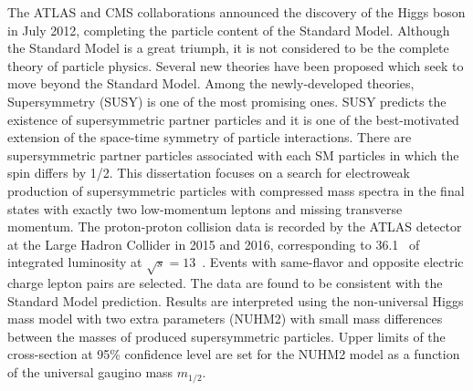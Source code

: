 The ATLAS and CMS collaborations announced the discovery of the Higgs boson in July 2012, completing the particle content of the Standard Model.
Although the Standard Model is a great triumph, it is not considered to be the complete theory of particle physics.
Several new theories have been proposed which seek to move beyond the Standard Model.
Among the newly-developed theories, Supersymmetry (SUSY) is one of the most promising ones.
SUSY predicts the existence of supersymmetric partner particles and it is one of the best-motivated extension of the space-time symmetry of particle interactions.
There are supersymmetric partner particles associated with each SM particles in which the spin differs by 1/2.
This dissertation focuses on a search for electroweak production of supersymmetric particles with compressed mass spectra in the final states with exactly two low-momentum leptons and missing transverse momentum.
The proton-proton collision data is recorded by the ATLAS detector at the Large Hadron Collider in 2015 and 2016, corresponding to 36.1~{\ifb} of integrated luminosity at $\sqrt{s} = 13$~{\TeV}.
Events with same-flavor and opposite electric charge lepton pairs are selected.
The data are found to be consistent with the Standard Model prediction.
Results are interpreted using the non-universal Higgs mass model with two extra parameters (NUHM2) with small mass differences between the masses of produced supersymmetric particles.
Upper limits of the cross-section at 95\% confidence level are set for the NUHM2 model as a function of the universal gaugino mass $m_{1/2}$.
